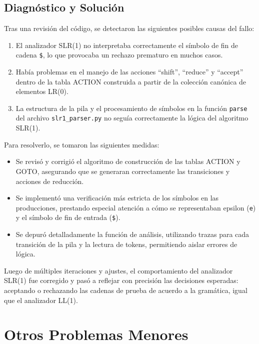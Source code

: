 \documentclass[11pt]{article}
\begin{document}
\subsection*{Diagnóstico y Solución}

Tras una revisión del código, se detectaron las siguientes posibles causas del fallo:

\begin{enumerate}
    \item El analizador SLR(1) no interpretaba correctamente el símbolo de fin de cadena \texttt{\$}, lo que provocaba un rechazo prematuro en muchos casos.
    \item Había problemas en el manejo de las acciones ``shift'', ``reduce'' y ``accept'' dentro de la tabla ACTION construida a partir de la colección canónica de elementos LR(0).
    \item La estructura de la pila y el procesamiento de símbolos en la función \texttt{parse} del archivo \texttt{slr1\_parser.py} no seguía correctamente la lógica del algoritmo SLR(1).
\end{enumerate}

Para resolverlo, se tomaron las siguientes medidas:

\begin{itemize}
    \item Se revisó y corrigió el algoritmo de construcción de las tablas ACTION y GOTO, asegurando que se generaran correctamente las transiciones y acciones de reducción.
    \item Se implementó una verificación más estricta de los símbolos en las producciones, prestando especial atención a cómo se representaban epsilon (\texttt{e}) y el símbolo de fin de entrada (\texttt{\$}).
    \item Se depuró detalladamente la función de análisis, utilizando trazas para cada transición de la pila y la lectura de tokens, permitiendo aislar errores de lógica.
\end{itemize}

Luego de múltiples iteraciones y ajustes, el comportamiento del analizador SLR(1) fue corregido y pasó a reflejar con precisión las decisiones esperadas: aceptando o rechazando las cadenas de prueba de acuerdo a la gramática, igual que el analizador LL(1).

\section*{Otros Problemas Menores}
\end{document}
